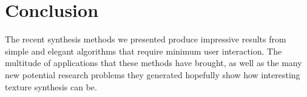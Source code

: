 

\section{Conclusion}

The recent synthesis methods we presented produce impressive results from simple and elegant algorithms that require minimum user interaction. The multitude of applications that these methods have brought, as well as the many new potential research problems they generated hopefully show how interesting texture synthesis can be.